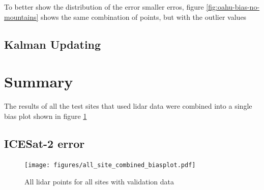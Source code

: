 To better show the distribution of the error smaller erros, figure \ref{fig:oahu-bias-no-mountains} shows the same combination of points, but with the outlier values 

\subsection{Kalman Updating}



\section{Summary}
The results of all the test sites that used lidar data were combined into a single bias plot shown in figure \ref{fig:all-sites-biasplot}

\subsection{ICESat-2 error}

\begin{figure}[h]
    \centering
    \texttt{[image: figures/all\_site\_combined\_biasplot.pdf]}
    \caption{All lidar points for all sites with validation data}
    \label{fig:all-sites-biasplot}
\end{figure}

